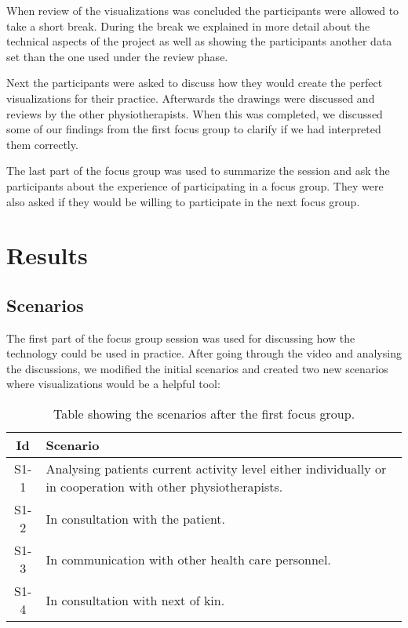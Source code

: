 When review of the visualizations was concluded the participants were allowed to take a short break. During the break we explained in more detail about the technical aspects of the project as well as showing the participants another data set than the one used under the review phase. %

Next the participants were asked to discuss how they would create the perfect visualizations for their practice. Afterwards the drawings were discussed and reviews by the other physiotherapists. When this was completed, we discussed some of our findings from the first focus group to clarify if we had interpreted them correctly.

The last part of the focus group was used to summarize the session and ask the participants about the experience of participating in a focus group. They were also asked if they would be willing to participate in the next focus group.

\section{Results}

\subsection{Scenarios}
The first part of the focus group session was used for discussing how the technology could be used in practice. After going through the video and analysing the discussions, we modified the initial scenarios and created two new scenarios where visualizations would be a helpful tool: 
\begin{table}[!h]
  \centering
  \begin{tabular}{|c|p{10cm}|}
    \hline
    \textbf{Id} & \textbf{Scenario} \\ \hline
    S1-1 & Analysing patients current activity level either individually or in cooperation with other physiotherapists. \\ \hline
    S1-2 & In consultation with the patient. \\ \hline
    S1-3 & In communication with other health care personnel. \\ \hline
    S1-4 & In consultation with next of kin. \\ \hline
  \end{tabular}
  \caption{Table showing the scenarios after the first focus group.}
\end{table}

